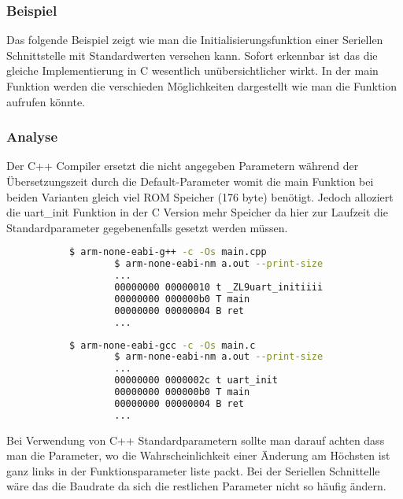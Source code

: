 \documentclass[MES,Master,ngerman]{twbook}%
\begin{document}
\subsubsection{Beispiel}          
Das folgende Beispiel zeigt wie man die Initialisierungsfunktion einer Seriellen Schnittstelle mit Standardwerten versehen kann. Sofort erkennbar ist das die gleiche Implementierung in C wesentlich unübersichtlicher wirkt. In der main Funktion werden die verschieden Möglichkeiten dargestellt wie man die Funktion aufrufen könnte.
\begin{figure}[!htb]
	\begin{subfigure}[b]{0.5\textwidth}
		
		\label{fig:3}
	\end{subfigure}
	\begin{subfigure}[b]{0.5\textwidth}
		
		\label{fig:4}
	\end{subfigure}
\end{figure}

\subsubsection{Analyse}
Der C++ Compiler ersetzt die nicht angegeben Parametern während der Übersetzungszeit durch die Default-Parameter womit die main Funktion bei beiden Varianten gleich viel ROM Speicher (176 byte) benötigt. Jedoch alloziert die uart\_init Funktion in der C Version mehr Speicher da hier zur Laufzeit die Standardparameter gegebenenfalls gesetzt werden müssen.

\begin{figure}[!htb]
	\begin{subfigure}[b]{0.5\textwidth}
		\begin{lstlisting}[gobble=6, title={Analyse C++}, language=bash, numbers=none]
		$ arm-none-eabi-g++ -c -Os main.cpp
		$ arm-none-eabi-nm a.out --print-size
		...
		00000000 00000010 t _ZL9uart_initiiii
		00000000 000000b0 T main
		00000000 00000004 B ret
		...
		\end{lstlisting}
	\end{subfigure}
	\begin{subfigure}[b]{0.5\textwidth}
		\begin{lstlisting}[gobble=6, title={Analyse C}, language=bash, numbers=none]
		$ arm-none-eabi-gcc -c -Os main.c
		$ arm-none-eabi-nm a.out --print-size
		...
		00000000 0000002c t uart_init
		00000000 000000b0 T main
		00000000 00000004 B ret
		...
		\end{lstlisting}
	\end{subfigure}
\end{figure}
Bei Verwendung von C++ Standardparametern sollte man darauf achten dass man die Parameter, wo die Wahrscheinlichkeit einer Änderung am Höchsten ist ganz links in der Funktionsparameter liste packt. Bei der Seriellen Schnittelle wäre das die Baudrate da sich die restlichen Parameter nicht so häufig ändern.  
\end{document}
